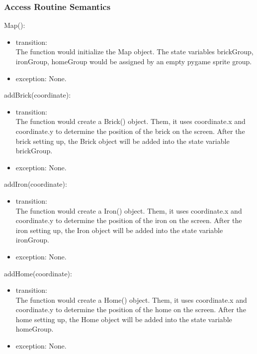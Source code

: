 \documentclass[12pt, titlepage]{article}
\begin{document}
		\subsubsection{Access Routine Semantics}
		Map():
		\begin{itemize}
		\item transition: \\
		The function would initialize the Map object. The state variables brickGroup, ironGroup, homeGroup would be assigned by an empty pygame sprite group.
		
		\item exception: None.
        \end{itemize}
        
        addBrick(coordinate):
		\begin{itemize}
		\item transition: \\
		The function would create a Brick() object. Them, it uses coordinate.x and coordinate.y to determine the position of the brick on the screen. After the brick setting up, the Brick object will be added into the state variable brickGroup.
		
		\item exception: None.
        \end{itemize}
        
        addIron(coordinate):
		\begin{itemize}
		\item transition: \\
		The function would create a Iron() object. Them, it uses coordinate.x and coordinate.y to determine the position of the iron on the screen. After the iron setting up, the Iron object will be added into the state variable ironGroup.
		
		\item exception: None.
        \end{itemize}
        
        addHome(coordinate):
		\begin{itemize}
		\item transition: \\
		The function would create a Home() object. Them, it uses coordinate.x and coordinate.y to determine the position of the home on the screen. After the home setting up, the Home object will be added into the state variable homeGroup.
		
		\item exception: None.
        \end{itemize}
        
\end{document}
